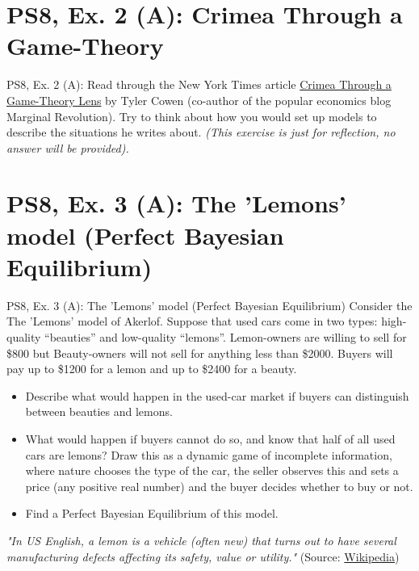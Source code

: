 \section{PS8, Ex. 2 (A): Crimea Through a Game-Theory }

\begin{frame}{PS8, Ex. 2 (A): }
    Read through the New York Times article \href{https://www.nytimes.com/2014/03/16/business/crimea-through-a-game-theory-lens.html}{Crimea Through a Game-Theory Lens} by Tyler Cowen (co-author of the popular economics blog Marginal Revolution). Try to think about how you would set up models to describe the situations he writes about. \textit{(This exercise is just for reflection, no answer will be provided).}
\end{frame}



\section{PS8, Ex. 3 (A): The 'Lemons' model (Perfect Bayesian Equilibrium)}

\begin{frame}{PS8, Ex. 3 (A): The 'Lemons' model (Perfect Bayesian Equilibrium)}
    Consider the The 'Lemons' model of Akerlof. Suppose that used cars come in two types: high-quality “beauties” and low-quality “lemons”. Lemon-owners are willing to sell for \$800 but Beauty-owners will not sell for anything less than \$2000. Buyers will pay up to \$1200 for a lemon and up to \$2400 for a beauty.
    \begin{itemize}
      \item[(a)] Describe what would happen in the used-car market if buyers can distinguish between beauties and lemons.
      \item[(b)] What would happen if buyers cannot do so, and know that half of all used cars are lemons? Draw this as a dynamic game of incomplete information, where nature chooses the type of the car, the seller observes this and sets a price (any positive real number) and the buyer decides whether to buy or not.
      \item[(c)] Find a Perfect Bayesian Equilibrium of this model.
    \end{itemize}
    \textit{"In US English, a lemon is a vehicle (often new) that turns out to have several manufacturing defects affecting its safety, value or utility."} (Source: \href{https://en.wikipedia.org/wiki/Lemon_(automobile)}{Wikipedia})
\end{frame}

